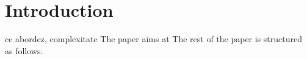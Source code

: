 \section{Introduction}
ce abordez, complexitate
The paper aims at 
The rest of the paper is structured as follows.